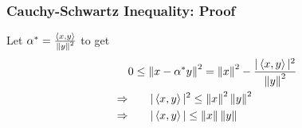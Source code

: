 \documentclass{beamer}
\begin{document}
\begin{frame}\frametitle{Cauchy-Schwartz Inequality: Proof}
Let $\alpha^*= \frac{\left< x,y \right>}{\left\| y\right\| ^2}$ to get
\begin{align*}
	& 0 \leq \left\| x - \alpha^*y\right\| ^2 = \left\| x\right\| ^2 - \frac{|\left< x,y \right>|^2}{\left\| y\right\| ^2} \\
	\Rightarrow &\qquad |\left< x,y \right> |^2 \leq \left\| x\right\| ^2\left\| y\right\| ^2 \\
	\Rightarrow &\qquad |\left< x,y \right> | \leq \left\| x\right\|  \left\| y\right\|
\end{align*}
\end{frame}
\end{document}
